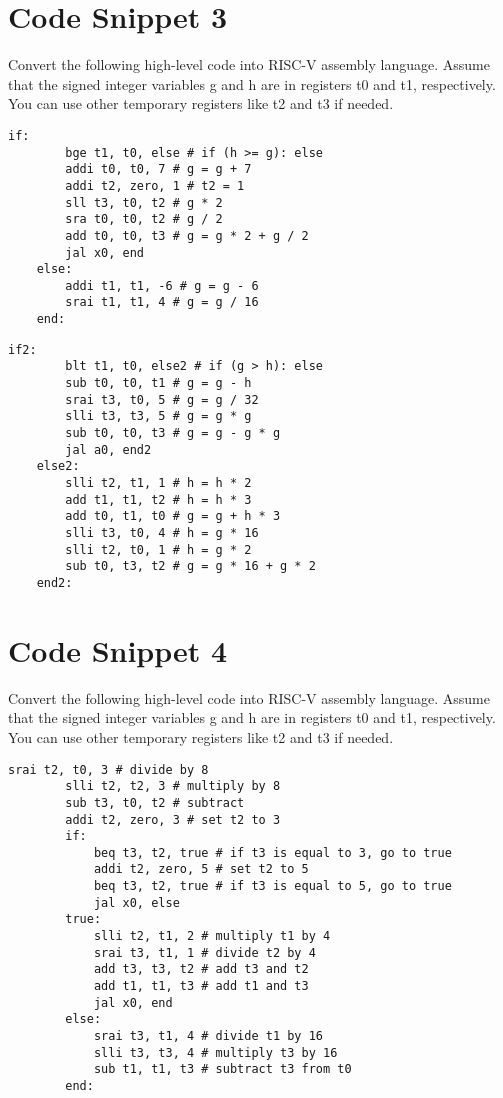 \documentclass[12pt]{article}
\begin{document}
    \newpage
    \section{Code Snippet 3}
    \begin{flushleft}
        Convert the following high-level code into RISC-V assembly language. Assume
        that the signed integer variables g and h are in registers t0 and t1, respectively. You can
        use other temporary registers like t2 and t3 if needed.
    \end{flushleft}
    \begin{lstlisting}[language=RISCV]
    if: 
        bge t1, t0, else # if (h >= g): else
        addi t0, t0, 7 # g = g + 7
        addi t2, zero, 1 # t2 = 1
        sll t3, t0, t2 # g * 2
        sra t0, t0, t2 # g / 2
        add t0, t0, t3 # g = g * 2 + g / 2
        jal x0, end
    else:
        addi t1, t1, -6 # g = g - 6
        srai t1, t1, 4 # g = g / 16
    end:
    \end{lstlisting}

    \begin{lstlisting}[language=RISCV]
    if2: 
        blt t1, t0, else2 # if (g > h): else
        sub t0, t0, t1 # g = g - h
        srai t3, t0, 5 # g = g / 32
        slli t3, t3, 5 # g = g * g
        sub t0, t0, t3 # g = g - g * g
        jal a0, end2
    else2:
        slli t2, t1, 1 # h = h * 2
        add t1, t1, t2 # h = h * 3
        add t0, t1, t0 # g = g + h * 3
        slli t3, t0, 4 # h = g * 16
        slli t2, t0, 1 # h = g * 2
        sub t0, t3, t2 # g = g * 16 + g * 2
    end2:
        \end{lstlisting}
    \newpage
    \section{Code Snippet 4}
    \begin{flushleft}
        Convert the following high-level code into RISC-V assembly language. Assume
that the signed integer variables g and h are in registers t0 and t1, respectively. You can
use other temporary registers like t2 and t3 if needed.
    \end{flushleft}
    \begin{lstlisting}[language=RISCV]
        srai t2, t0, 3 # divide by 8
        slli t2, t2, 3 # multiply by 8
        sub t3, t0, t2 # subtract
        addi t2, zero, 3 # set t2 to 3
        if:
            beq t3, t2, true # if t3 is equal to 3, go to true
            addi t2, zero, 5 # set t2 to 5
            beq t3, t2, true # if t3 is equal to 5, go to true
            jal x0, else
        true:
            slli t2, t1, 2 # multiply t1 by 4
            srai t3, t1, 1 # divide t2 by 4
            add t3, t3, t2 # add t3 and t2
            add t1, t1, t3 # add t1 and t3
            jal x0, end
        else:
            srai t3, t1, 4 # divide t1 by 16
            slli t3, t3, 4 # multiply t3 by 16
            sub t1, t1, t3 # subtract t3 from t0
        end:
    \end{lstlisting}
\end{document}
